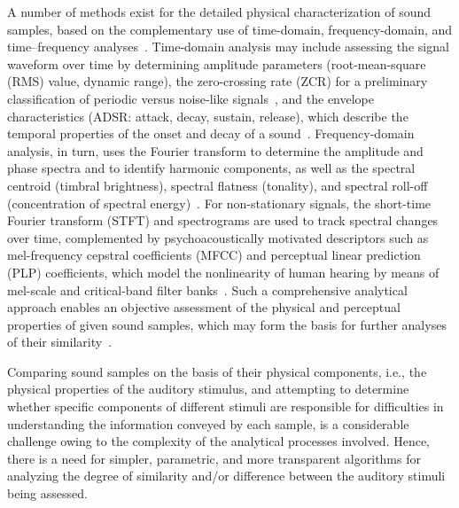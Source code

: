 \documentclass{article}
\begin{document}
A number of methods exist for the detailed physical characterization of sound samples, based on the complementary use of time-domain, frequency-domain, and time--frequency analyses~\cite{Letowski1989SoundQuality,Peeters2004CUIDADO}. Time-domain analysis may include assessing the signal waveform over time by determining amplitude parameters (root-mean-square (RMS) value, dynamic range), the zero-crossing rate (ZCR) for a preliminary classification of periodic versus noise-like signals~\cite{Gouyon2000}, and the envelope characteristics (ADSR: attack, decay, sustain, release), which describe the temporal properties of the onset and decay of a sound~\cite{Peeters2004CUIDADO}. Frequency-domain analysis, in turn, uses the Fourier transform to determine the amplitude and phase spectra and to identify harmonic components, as well as the spectral centroid (timbral brightness), spectral flatness (tonality), and spectral roll-off (concentration of spectral energy)~\cite{Peeters2004CUIDADO,saitis2020brightness}.
For non-stationary signals, the short-time Fourier transform (STFT) and spectrograms are used to track spectral changes over time, complemented by psychoacoustically motivated descriptors such as mel-frequency cepstral coefficients (MFCC) and perceptual linear prediction (PLP) coefficients, which model the nonlinearity of human hearing by means of mel-scale and critical-band filter banks~\cite{Hermansky1990,tracey2023interpretable_mfcc}.
Such a comprehensive analytical approach enables an objective assessment of the physical and perceptual properties of given sound samples, which may form the basis for further analyses of their similarity~\cite{Peeters2004CUIDADO}.

Comparing sound samples on the basis of their physical components, i.e., the physical properties of the auditory stimulus, and attempting to determine whether specific components of different stimuli are responsible for difficulties in understanding the information conveyed by each sample, is a considerable challenge owing to the complexity of the analytical processes involved. Hence, there is a need for simpler, parametric, and more transparent algorithms for analyzing the degree of similarity and/or difference between the auditory stimuli being assessed.
\end{document}
